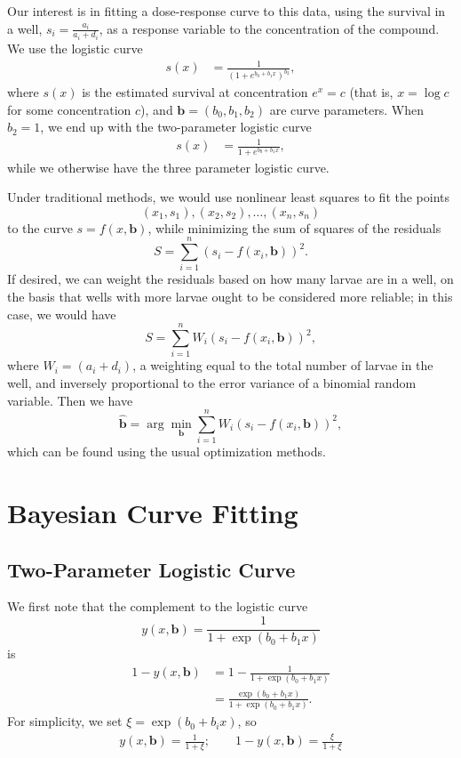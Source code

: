 \documentclass[11pt, letterpaper]{article}
\numberwithin{equation}{section}
\begin{document}
Our interest is in fitting a dose-response curve to this data, using the survival in a well, $s_i = \frac{a_i}{a_i+d_i}$, as a response variable to the concentration of the compound. We use the logistic curve 
\begin{align*}
s(x) &= \frac{1}{\left(1+e^{b_0 + b_1x}\right)^{b_2}},
\end{align*}
where $s(x)$ is the estimated survival at concentration $e^x = c$ (that is, $x = \log c$ for some concentration $c$), and $\bm b = (b_0, b_1, b_2)$ are curve parameters. When $b_2 =1$, we end up with the two-parameter logistic curve 
\begin{align*}
s(x) &= \frac{1}{1+e^{b_0 + b_1x}},
\end{align*}
while we otherwise have the three parameter logistic curve.

Under traditional methods, we would use nonlinear least squares to fit the points $$(x_1, s_1), (x_2, s_2), \dots, (x_n, s_n)$$ to the curve $s = f(x, \bm b)$, while minimizing the sum of squares of the residuals $$S = \sum_{i=1}^n \left(s_i - f(x_i, \bm b) \right)^2.$$ If desired, we can weight the residuals based on how many larvae are in a well, on the basis that wells with more larvae ought to be considered more reliable; in this case, we would have $$S = \sum_{i=1}^n W_i\left(s_i - f(x_i, \bm b) \right)^2,$$
where $W_i = (a_i+d_i)$, a weighting equal to the total number of larvae in the well, and inversely proportional to the error variance of a binomial random variable. Then we have $$ \hat{\bm b} = \arg \min_{\bm b} \sum_{i=1}^n W_i\left(s_i - f(x_i, \bm b) \right)^2,$$ which can be found using the usual optimization methods. 


\section{Bayesian Curve Fitting}
\subsection{Two-Parameter Logistic Curve}
We first note that the complement to the logistic curve $$y(x, \bm b) = \frac{1}{1+\exp(b_0+b_1x)} $$ is 
\begin{align*}
1 - y(x, \bm b) & = 1- \frac{1}{1+\exp(b_0+b_1x)} \\
& = \frac{\exp(b_0+b_1x)}{1+\exp(b_0+b_1x)}.
\end{align*}
For simplicity, we set $\xi = \exp(b_0 + b_i x)$, so 
\begin{align*}
y(x, \bm b) = \frac{1}{1+\xi}; \qquad 1 - y(x, \bm b) =  \frac{\xi}{1+\xi}
\end{align*}
\end{document}
